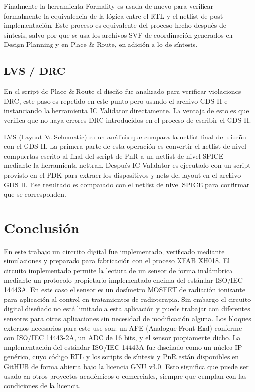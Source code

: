\documentclass[a4paper, twoside, 11pt]{report}
\begin{document}
Finalmente la herramienta Formality es usada de nuevo para verificar formalmente la equivalencia de la lógica entre el RTL y el netlist de post implementación. Este proceso es equivalente del proceso hecho después de síntesis, salvo por que se usa los archivos SVF de coordinación generados en Design Planning y en Place \& Route, en adición a lo de síntesis.

\FloatBarrier
\section{LVS / DRC}

En el script de Place \& Route el diseño fue analizado para verificar violaciones DRC, este paso es repetido en este punto pero usando el archivo GDS II e instanciando la herramienta IC Validator directamente. La ventaja de esto es que verifica que no haya errores DRC introducidos en el proceso de escribir el GDS II.

LVS (Layout Vs Schematic) es un análisis que compara la netlist final del diseño con el GDS II. La primera parte de esta operación es convertir el netlist de nivel compuertas escrito al final del script de PnR a un netlist de nivel SPICE mediante la herramienta nettran. Después IC Validator es ejecutado con un script provisto en el PDK para extraer los dispositivos y nets del layout en el archivo GDS II. Ese resultado es comparado con el netlist de nivel SPICE para confirmar que se corresponden.


\FloatBarrier
\chapter{Conclusión}

En este trabajo un circuito digital fue implementado, verificado mediante simulaciones y preparado para fabricación con el proceso XFAB XH018. El circuito implementado permite la lectura de un sensor de forma inalámbrica mediante un protocolo propietario implementado encima del estándar ISO/IEC 14443A. En este caso el sensor es un dosímetro MOSFET de radiación ionizante para aplicación al control en tratamientos de radioterapia. Sin embargo el circuito digital diseñado no está limitado a esta aplicación y puede trabajar con diferentes sensores para otras aplicaciones sin necesidad de modificación alguna. Los bloques externos necesarios para este uso son: un AFE (Analogue Front End) conforme con ISO/IEC 14443-2A, un ADC de 16 bits, y el sensor propiamente dicho. La implementación del estándar ISO/IEC 14443A fue diseñado como un núcleo IP genérico, cuyo código RTL y los scripts de síntesis y PnR están disponibles en GitHUB de forma abierta bajo la licencia GNU v3.0. Esto significa que puede ser usado en otros proyectos académicos o comerciales, siempre que cumplan con las condiciones de la licencia.
\end{document}
